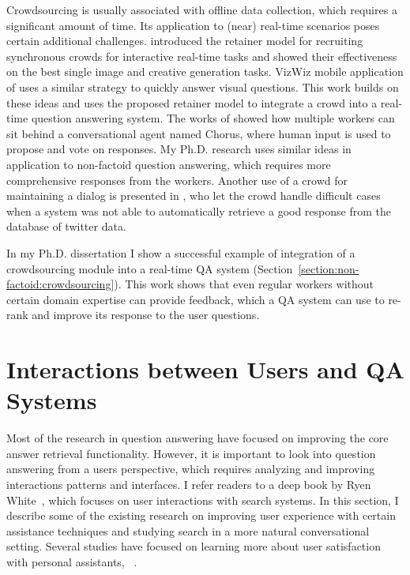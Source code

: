 Crowdsourcing is usually associated with offline data collection, which requires a significant amount of time.
Its application to (near) real-time scenarios poses certain additional challenges.
\cite{bernstein2011crowds} introduced the retainer model for recruiting synchronous crowds for interactive real-time tasks and showed their effectiveness on the best single image and creative generation tasks.
VizWiz mobile application of \cite{bigham2010vizwiz} uses a similar strategy to quickly answer visual questions.
This work builds on these ideas and uses the proposed retainer model to integrate a crowd into a real-time question answering system.
The works of \cite{huang2016there,huang2015guardian,Lasecki:2013:CCC:2501988.2502057} showed how multiple workers can sit behind a conversational agent named Chorus, where human input is used to propose and vote on responses.
My Ph.D. research uses similar ideas in application to non-factoid question answering, which requires more comprehensive responses from the workers.
Another use of a crowd for maintaining a dialog is presented in \cite{Bessho:2012:DSU:2392800.2392841}, who let the crowd handle difficult cases when a system was not able to automatically retrieve a good response from the database of twitter data.

In my Ph.D. dissertation I show a successful example of integration of a crowdsourcing module into a real-time QA system (Section~\ref{section:non-factoid:crowdsourcing}).
This work shows that even regular workers without certain domain expertise can provide feedback, which a QA system can use to re-rank and improve its response to the user questions.

\section{Interactions between Users and QA Systems}
\label{section:relatedwork:user}

Most of the research in question answering have focused on improving the core answer retrieval functionality.
However, it is important to look into question answering from a users perspective, which requires analyzing and improving interactions patterns and interfaces.
I refer readers to a deep book by Ryen White~\cite{white2016interactions}, which focuses on user interactions with search systems.
In this section, I describe some of the existing research on improving user experience with certain assistance techniques and studying search in a more natural conversational setting.
Several studies have focused on learning more about user satisfaction with personal assistants, \eg~\cite{kiseleva2016understanding,Liu:2008:PIS:1390334.1390417,ong2009measurement}.

